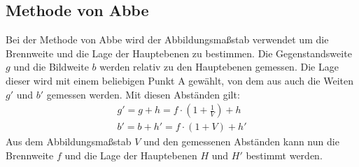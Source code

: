\subsection{Methode von Abbe}
\label{Theorie/Abbe}
Bei der Methode von Abbe wird der Abbildungsma\ss{}stab verwendet um die Brennweite und die Lage der Hauptebenen zu bestimmen. Die Gegenstandsweite $g$ und die Bildweite $b$ werden relativ zu den Hauptebenen gemessen. Die Lage dieser wird mit einem beliebigen Punkt A gewählt, von dem aus auch die Weiten $g'$ und $b'$ gemessen werden. 
Mit diesen Abständen gilt:
\begin{gather}
	g' = g +h = f\cdot\left(1 + \frac{1}{V}\right) + h \\
	b' = b + h' = f\cdot(1 + V) + h'
\end{gather}
Aus dem Abbildungsma\ss{}stab $V$ und den gemessenen Abständen kann nun die Brennweite $f$ und die Lage der Hauptebenen $H$ und $H'$ bestimmt werden. 
